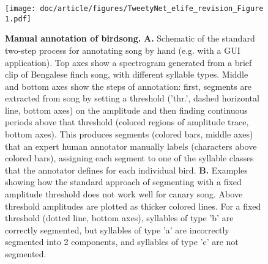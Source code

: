 \documentclass[9pt,lineno]{elife}
\begin{document}
\begin{figure}[!ht] %
\texttt{[image: doc/article/figures/TweetyNet\_elife\_revision\_Figure 1.pdf]}
\caption{{\bf Manual annotation of birdsong.}
\textbf{A.} Schematic of the standard two-step process for annotating song by hand (e.g. with a GUI application).
Top axes show a spectrogram generated from a brief clip of Bengalese finch song,  
with different syllable types. 
Middle and bottom axes show the steps of annotation: 
first, segments are extracted from song 
by setting a threshold ('thr.', dashed horizontal line, bottom axes) on the amplitude 
and then finding continuous periods  
above that threshold (colored regions of amplitude trace, bottom axes).
This produces segments (colored bars, middle axes)
that an expert human annotator manually labels 
(characters above colored bars),  
assigning each segment to one of the syllable classes that 
the annotator defines for each individual bird. 
\textbf{B.} Examples showing how the standard approach of 
segmenting with a fixed amplitude threshold does not work well for canary song. 
Above threshold amplitudes are plotted as thicker colored lines. 
For a fixed threshold (dotted line, bottom axes), 
syllables of type 'b' are correctly segmented, 
but syllables of type ’a’ are incorrectly segmented into 2 components,  
and syllables of type ’c’ are not segmented.
}
\label{fig:manual_song_annotation}
\label{figsupp:sf1}
\end{figure}
\end{document}
